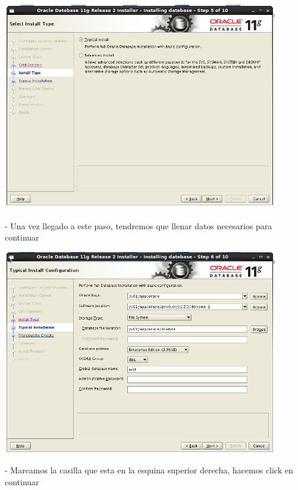 \documentclass[12pt,letterpaper]{article}
\begin{document}
\begin{center}
	\includegraphics[width=12cm]{./Imagenes/47} 
\end{center}


\begin{itemize}
- Una vez llegado a este paso, tendremos que llenar datos necesarios para continuar \\
\end{itemize}

\begin{center}
	\includegraphics[width=12cm]{./Imagenes/48} 
\end{center}

\begin{itemize}
- Marcamos la casilla que esta en la esquina superior derecha, hacemos click en continuar \\
\end{itemize}
\end{document}
